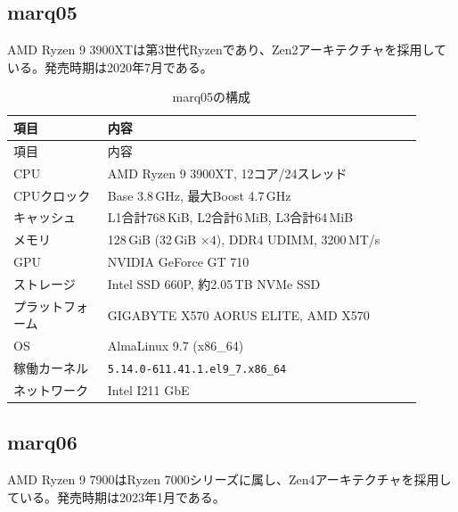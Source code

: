 \documentclass[../main.tex]{subfiles}
\begin{document}
\subsection{marq05}
\label{sec:environment-marq05}
AMD Ryzen 9 3900XTは第3世代Ryzenであり、Zen2アーキテクチャを採用している。発売時期は2020年7月である。

\begingroup
\small
\renewcommand{\arraystretch}{1.2}
\begin{longtable}{|p{0.21\linewidth}|p{0.70\linewidth}|}
\caption{marq05の構成}\label{tab:environment-marq05}\\
\hline
項目 & 内容 \\
\hline
\endfirsthead
\hline
項目 & 内容 \\
\hline
\endhead
CPU & AMD Ryzen 9 3900XT, 12コア/24スレッド \\
\hline
CPUクロック & Base 3.8\,GHz, 最大Boost 4.7\,GHz \\
\hline
キャッシュ & L1合計768\,KiB, L2合計6\,MiB, L3合計64\,MiB \\
\hline
メモリ & 128\,GiB (32\,GiB $\times 4$), DDR4 UDIMM, 3200\,MT/s \\
\hline
GPU & NVIDIA GeForce GT 710 \\
\hline
ストレージ & Intel SSD 660P, 約2.05\,TB NVMe SSD \\
\hline
プラットフォーム & GIGABYTE X570 AORUS ELITE, AMD X570 \\
\hline
OS & AlmaLinux 9.7 (x86\_64) \\
\hline
稼働カーネル & \texttt{5.14.0-611.41.1.el9\_7.x86\_64} \\
\hline
ネットワーク & Intel I211 GbE \\
\hline
\end{longtable}
\endgroup


\subsection{marq06}
\label{sec:environment-marq06}
AMD Ryzen 9 7900はRyzen 7000シリーズに属し、Zen4アーキテクチャを採用している。発売時期は2023年1月である。
\end{document}
